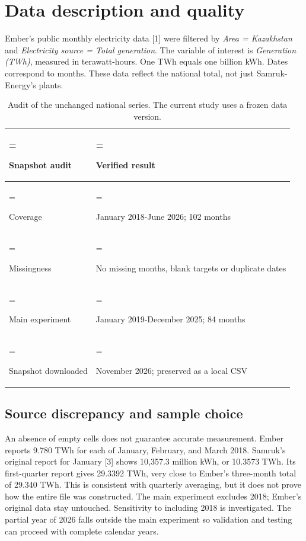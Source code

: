 \documentclass[11pt,a4paper,twoside,reqno]{amsart}
\numberwithin{equation}{section}
\begin{document}
\section{Data description and quality}

Ember's public monthly electricity data [1] were filtered by \textit{Area = Kazakhstan} and \textit{Electricity source = Total generation}. The variable of interest is \textit{Generation (TWh)}, measured in terawatt-hours. One TWh equals one billion kWh. Dates correspond to months. These data reflect the national total, not just Samruk-Energy's plants.\par

\begin{table}[htbp]
\centering
\caption{Audit of the unchanged national series. The current study uses a frozen data version.}
{\fontsize{9.2}{11.3}\selectfont\begin{tabularx}{\linewidth}{@{}>{\hsize=0.64000\hsize\linewidth=\hsize\raggedright\arraybackslash}X>{\hsize=1.36000\hsize\linewidth=\hsize\raggedright\arraybackslash}X@{}}\toprule



Snapshot audit & Verified result \\

\midrule

Coverage & January 2018-June 2026; 102 months \\

Missingness & No missing months, blank targets or duplicate dates \\

Main experiment & January 2019-December 2025; 84 months \\

Snapshot downloaded & 18 November 2026; preserved as a local CSV \\

\bottomrule\end{tabularx}}
\end{table}



\subsection{Source discrepancy and sample choice}

An absence of empty cells does not guarantee accurate measurement. Ember reports 9.780 TWh for each of January, February, and March 2018. Samruk's original report for January [3] shows 10,357.3 million kWh, or 10.3573 TWh. Its first-quarter report gives 29.3392 TWh, very close to Ember's three-month total of 29.340 TWh. This is consistent with quarterly averaging, but it does not prove how the entire file was constructed. The main experiment excludes 2018; Ember's original data stay untouched. Sensitivity to including 2018 is investigated. The partial year of 2026 falls outside the main experiment so validation and testing can proceed with complete calendar years.\par
\end{document}
